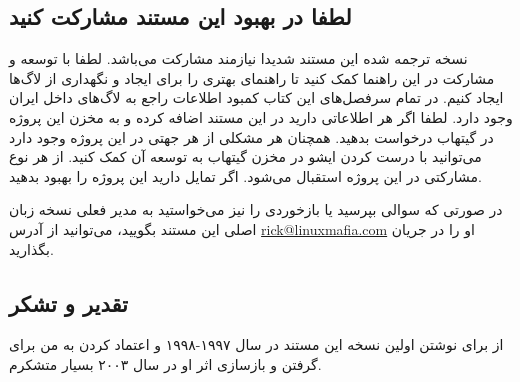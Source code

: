 \subsection{لطفا در  بهبود این مستند مشارکت کنید}

نسخه ترجمه شده این مستند شدیدا نیازمند مشارکت می‌باشد. لطفا با توسعه و مشارکت در این راهنما
کمک کنید تا راهنمای بهتری را برای ایجاد و نگهداری از لاگ‌ها ایجاد کنیم. در تمام سرفصل‌های این کتاب
کمبود اطلاعات راجع به لاگ‌های داخل ایران وجود دارد. لطفا اگر هر اطلاعاتی دارید در این مستند اضافه کرده
و به مخزن این پروژه در گیتهاب درخواست بدهید. همچنان هر مشکلی از هر جهتی در این پروژه وجود دارد
می‌توانید با درست کردن ایشو در مخزن گیتهاب
به توسعه آن کمک کنید.
از هر نوع مشارکتی در این پروژه استقبال می‌شود. اگر تمایل دارید این پروژه را بهبود بدهید.

در صورتی که سوالی بپرسید یا بازخوردی را نیز می‌خواستید به مدیر فعلی نسخه زبان اصلی این مستند بگویید،
می‌توانید از آدرس
\href{mailto:rick@linuxmafia.com}{rick@linuxmafia.com}
او را در جریان بگذارید.


%

\subsection{تقدیر و تشکر}

از
برای نوشتن اولین نسخه این مستند در سال ۱۹۹۷-۱۹۹۸ و اعتماد کردن به من برای گرفتن و بازسازی
اثر او در سال ۲۰۰۳ بسیار متشکرم.

